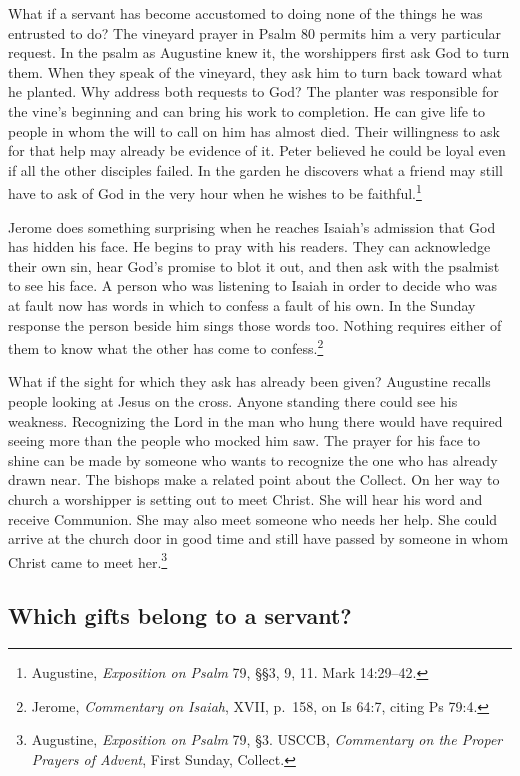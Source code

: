 What if a servant has become accustomed to doing none of the things he was entrusted to do? The vineyard prayer in Psalm 80 permits him a very particular request. In the psalm as Augustine knew it, the worshippers first ask God to turn them. When they speak of the vineyard, they ask him to turn back toward what he planted. Why address both requests to God? The planter was responsible for the vine's beginning and can bring his work to completion. He can give life to people in whom the will to call on him has almost died. Their willingness to ask for that help may already be evidence of it. Peter believed he could be loyal even if all the other disciples failed. In the garden he discovers what a friend may still have to ask of God in the very hour when he wishes to be faithful.\footnote{Augustine, \textit{Exposition on Psalm} 79, §§3, 9, 11. Mark 14:29--42.}

Jerome does something surprising when he reaches Isaiah's admission that God has hidden his face. He begins to pray with his readers. They can acknowledge their own sin, hear God's promise to blot it out, and then ask with the psalmist to see his face. A person who was listening to Isaiah in order to decide who was at fault now has words in which to confess a fault of his own. In the Sunday response the person beside him sings those words too. Nothing requires either of them to know what the other has come to confess.\footnote{Jerome, \textit{Commentary on Isaiah}, XVII, p.~158, on Is 64:7, citing Ps 79:4.}

What if the sight for which they ask has already been given? Augustine recalls people looking at Jesus on the cross. Anyone standing there could see his weakness. Recognizing the Lord in the man who hung there would have required seeing more than the people who mocked him saw. The prayer for his face to shine can be made by someone who wants to recognize the one who has already drawn near. The bishops make a related point about the Collect. On her way to church a worshipper is setting out to meet Christ. She will hear his word and receive Communion. She may also meet someone who needs her help. She could arrive at the church door in good time and still have passed by someone in whom Christ came to meet her.\footnote{Augustine, \textit{Exposition on Psalm} 79, §3. USCCB, \textit{Commentary on the Proper Prayers of Advent}, First Sunday, Collect.}

\subsection{Which gifts belong to a servant?}

